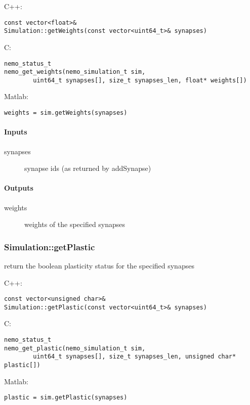 \noindent C++:
\begin{lstlisting}[aboveskip=2pt]
const vector<float>&
Simulation::getWeights(const vector<uint64_t>& synapses)
\end{lstlisting}

\noindent C:
\begin{lstlisting}[aboveskip=2pt]
nemo_status_t
nemo_get_weights(nemo_simulation_t sim, 
        uint64_t synapses[], size_t synapses_len, float* weights[])
\end{lstlisting}

\noindent Matlab:
\begin{lstlisting}[aboveskip=2pt]
weights = sim.getWeights(synapses)
\end{lstlisting}
\paragraph{Inputs}
\begin{description}
\item[synapses] synapse ids (as returned by addSynapse)
\end{description}
\paragraph{Outputs}
\begin{description}
\item[weights] weights of the specified synapses
\end{description}

\clearpage
\subsubsection*{Simulation::getPlastic}
\label{fn: getPlastic}
return the boolean plasticity status for the specified synapses


\noindent C++:
\begin{lstlisting}[aboveskip=2pt]
const vector<unsigned char>&
Simulation::getPlastic(const vector<uint64_t>& synapses)
\end{lstlisting}

\noindent C:
\begin{lstlisting}[aboveskip=2pt]
nemo_status_t
nemo_get_plastic(nemo_simulation_t sim, 
        uint64_t synapses[], size_t synapses_len, unsigned char* plastic[])
\end{lstlisting}

\noindent Matlab:
\begin{lstlisting}[aboveskip=2pt]
plastic = sim.getPlastic(synapses)
\end{lstlisting}
